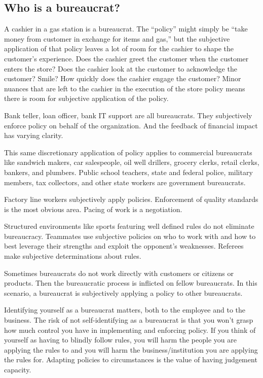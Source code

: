 \subsection{Who is a bureaucrat?}

A cashier in a gas station is a bureaucrat. The ``policy'' might simply be ``take money from customer in exchange for items and gas,'' but the subjective application of that policy leaves a lot of room for the cashier to shape the customer's experience. Does the cashier greet the customer when the customer enters the store? Does the cashier look at the customer to acknowledge the customer? Smile? How quickly does the cashier engage the customer? Minor nuances that are left to the cashier in the execution of the store policy means there is room for subjective application of the policy. 

Bank teller, loan officer, bank IT support are all bureaucrats. They subjectively enforce policy on behalf of the organization. And the feedback of financial impact has varying clarity.


This same discretionary application of policy applies to commercial bureaucrats like sandwich makers, car salespeople, oil well drillers, grocery clerks, retail clerks, bankers, and plumbers. Public school teachers, state and federal police, military members, tax collectors, and other state workers are government bureaucrats. 




Factory line workers subjectively apply policies. Enforcement of quality standards is the most obvious area. Pacing of work is a negotiation.

Structured environments like sports featuring well defined rules do not eliminate bureaucracy. Teammates use subjective policies on who to work with and how to best leverage their strengths and exploit the opponent's weaknesses. Referees make subjective determinations about rules.

Sometimes bureaucrats do not work directly with customers or citizens or products. Then the bureaucratic process is inflicted on fellow bureaucrats. In this scenario, a bureaucrat is subjectively applying a policy to other bureaucrats. 

Identifying yourself as a bureaucrat matters, both to the employee and to the business. The risk of not self-identifying as a bureaucrat is that you won't grasp how much control you have in implementing and enforcing policy. If you think of yourself as having to blindly follow rules, you will harm the people you are applying the rules to and you will harm the business/institution you are applying the rules for. Adapting policies to circumstances is the value of having judgement capacity. 

